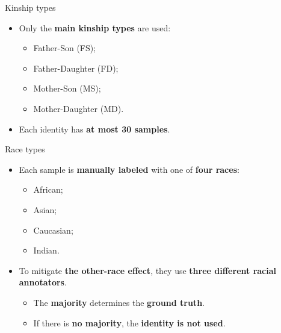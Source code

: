 \documentclass[aspectratio=169,xcolor=dvipsnames]{beamer}
\begin{document}

\begin{frame}{Kinship types}
    \begin{itemize}
        \item Only the \textbf{main kinship types} are used:
        \begin{itemize}
            \item Father-Son (FS);
            \item Father-Daughter (FD);
            \item Mother-Son (MS); 
            \item Mother-Daughter (MD).
        \end{itemize}
        \item Each identity has \textbf{at most 30 samples}.
    \end{itemize}
\end{frame}


\begin{frame}{Race types}
    \begin{itemize}
        \item Each sample is \textbf{manually labeled} with one of \textbf{four races}:
        \begin{itemize}
            \item African;
            \item Asian;
            \item Caucasian; 
            \item Indian.
        \end{itemize} 
        \item To mitigate \textbf{the other-race effect}, they use \textbf{three different racial annotators}. 
        \begin{itemize}
            \item The \textbf{majority} determines the \textbf{ground truth}. 
            \item If there is \textbf{no majority}, the \textbf{identity is not used}.
        \end{itemize}
    \end{itemize} 
\end{frame}

\end{document}
